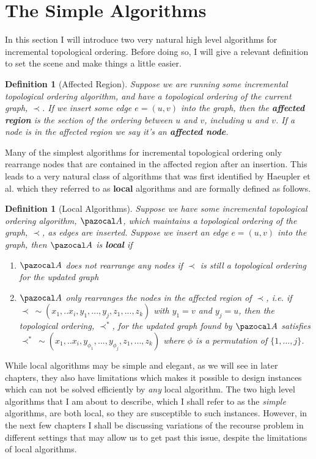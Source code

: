 \documentclass{report}
\newtheorem{definition}[theorem]{Definition}
\begin{document}
\section{The Simple Algorithms}

In this section I will introduce two very natural high level algorithms for incremental topological ordering. Before doing so, I will give a relevant definition to set the scene and make things a little easier.

\begin{definition}[Affected Region]
Suppose we are running some incremental topological ordering algorithm, and have a topological ordering of the current graph, $\prec$. If we insert some edge $e=(u,v)$ into the graph, then the \textbf{affected region} is the section of the ordering between $u$ and $v$, including $u$ and $v$. If a node is in the affected region we say it's an \textbf{affected node}.
\end{definition}

Many of the simplest algorithms for incremental topological ordering only rearrange nodes that are contained in the affected region after an insertion. This leads to a very natural class of algorithms that was first identified by Haeupler et al. \cite{HaeuplerKMST12} which they referred to as \textbf{local} algorithms and are formally defined as follows.

\begin{definition}[Local Algorithms]\label{localalgo}
Suppose we have some incremental topological ordering algorithm, $\pazocal A$, which maintains a topological ordering of the graph, $\prec$, as edges are inserted. Suppose we insert an edge $e=(u,v)$ into the graph, then $\pazocal A$ is \textbf{local} if
\begin{enumerate}
    \item $\pazocal A$ does not rearrange any nodes if $\prec$ is still a topological ordering for the updated graph
    \item $\pazocal A$ only rearranges the nodes in the affected region of $\prec$, i.e. if $\prec \: \sim (x_1,..x_i,y_1,...,y_j,z_1,...,z_k)$ with $y_1 = v$ and $y_j = u$, then the topological ordering, $\prec^*$, for the updated graph found by $\pazocal A$ satisfies $\prec^* \: \sim (x_1,..x_i,y_{\phi_1},...,y_{\phi_j},z_1,...,z_k)$ where $\phi$ is a permutation of $\{1,...,j\}$.
\end{enumerate}
\end{definition}

While local algorithms may be simple and elegant, as we will see in later chapters, they also have limitations which makes it possible to design instances which can not be solved efficiently by \textit{any} local algorithm. The two high level algorithms that I am about to describe, which I shall refer to as the \textit{simple} algorithms, are both local, so they are susceptible to such instances. However, in the next few chapters I shall be discussing variations of the recourse problem in different settings that may allow us to get past this issue, despite the limitations of local algorithms.
\end{document}
